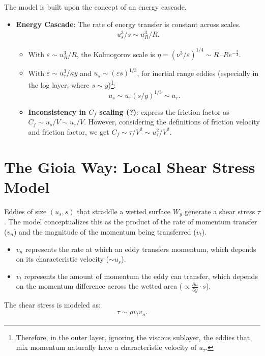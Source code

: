 \documentclass[10pt]{article}
\begin{document}
The model is built upon the concept of an energy cascade.
\begin{itemize}
    \item \textbf{Energy Cascade}: The rate of energy transfer is constant across scales.
        \begin{align*}
            u_s^3 / s \sim u_R^3 / R
        .\end{align*}
        \begin{itemize}
            \item With $\varepsilon \sim u_R^3 / R$, the Kolmogorov scale is $\eta = \left( \nu^3 / \varepsilon \right)^{1 / 4}\sim R\cdot Re^{-\frac{3}{4}} $. 
            \item With $\varepsilon  \sim {u_{\tau }^3}/{\kappa y}$ and $u_s\sim \left( \varepsilon s \right) ^{1 / 3} $, for inertial range eddies (especially in the log layer, where $s \sim y$)\footnote{Therefore, in the outer layer, ignoring the viscous sublayer, the eddies that mix momentum naturally have a characteristic velocity of $u_{\tau }$.}:
                $$u_s \sim u_{\tau } \left( s / y \right) ^{1 / 3} \sim u_{\tau}.$$ 
            \item \textbf{Inconsistency in $C_f$ scaling (?)}: \citet{gioiaFriction2006} express the friction factor as $C_f \sim u_s / V \sim u_{\tau } / V$. However, considering the definitions of friction velocity and friction factor, we get $C_f \sim \tau / V^2 \sim u_{\tau }^2 / V^2$.
        \end{itemize}
\end{itemize}


\section{The Gioia Way: Local Shear Stress Model}

Eddies of size $(u_s, s)$ that straddle a wetted surface $W_y$ generate a shear stress $\tau$. The model conceptualizes this as the product of the rate of momentum transfer ($v_n$) and the magnitude of the momentum being transferred ($v_t$).
\begin{itemize}
    \item $v_n$ represents the rate at which an eddy transfers momentum, which depends on its characteristic velocity ($\sim u_s$).
    \item $v_t$ represents the amount of momentum the eddy can transfer, which depends on the momentum difference across the wetted area ($\propto \frac{\partial u}{\partial y}\cdot s $).
\end{itemize}
The shear stress is modeled as:
\begin{align*}
    \tau \sim \rho v_t v_n
.\end{align*}
\end{document}
